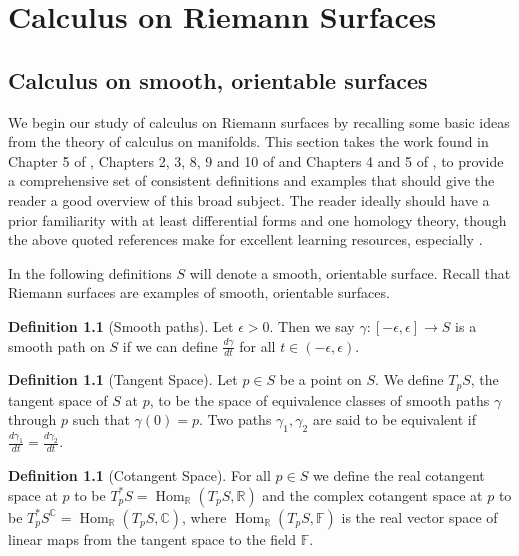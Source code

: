 \documentclass[11pt]{report}
\theoremstyle{definition}
\newtheorem{defn}[thm]{Definition}
\DeclareMathOperator{\Hom}{Hom}
\begin{document}
\newpage 
\chapter{Calculus on Riemann Surfaces}

\section{Calculus on smooth, orientable surfaces}
We begin our study of calculus on Riemann surfaces by recalling some basic ideas from the theory of calculus on manifolds. This section takes the work found in Chapter 5 of \cite{donaldson}, Chapters 2, 3, 8, 9 and 10 of \cite{calcohomo} and Chapters 4 and 5 of \cite{spivak}, to provide a comprehensive set of consistent definitions and examples that should give the reader a good overview of this broad subject. The reader ideally should have a prior familiarity with at least differential forms and one homology theory, though the above quoted references make for excellent learning resources, especially \cite{calcohomo}. 

In the following definitions $S$ will denote a smooth, orientable surface. Recall that Riemann surfaces are examples of smooth, orientable surfaces. 

\begin{defn}[Smooth paths]\label{Smooth Path}
  Let $\epsilon > 0$. Then we say $\gamma:[-\epsilon,\epsilon] \rightarrow S$ is a smooth path on $S$ if we can define $\frac{d\gamma}{dt}$ for all $t \in (-\epsilon,\epsilon)$.
\end{defn}

\begin{defn}[Tangent Space]\label{TpX}
  Let $p \in S$ be a point on $S$. We define $T_pS$, the tangent space of $S$ at
  $p$, to be the space of equivalence classes of smooth paths $\gamma$ through $p$ such that $\gamma(0)=p$. Two paths $\gamma_1, \gamma_2$ are said to be
  equivalent if $\frac{d\gamma_1}{dt}=\frac{d\gamma_2}{dt}$.
\end{defn}

\begin{defn}[Cotangent Space]\label{T*pX}
  For all $p \in S$ we define the real cotangent space at $p$ to be
  $T^*_pS = \Hom_{\mathbb{R}}(T_pS, \mathbb{R})$ and the complex cotangent
  space at $p$ to be $T^*_pS^{\mathbb{C}} = \Hom_{\mathbb{R}}(T_pS,\mathbb{C})$, where $\Hom_{\mathbb{R}}(T_pS, \mathbb{F})$ is the real vector space of linear maps from the tangent space to the field $\mathbb{F}$.
\end{defn}
\end{document}
